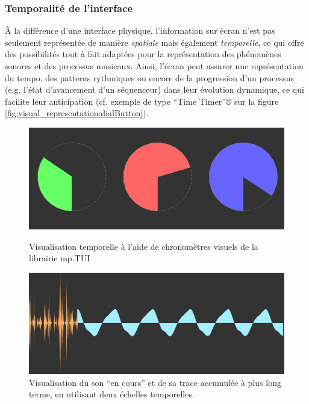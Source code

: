 \subsubsection{Temporalité de l'interface} 

\noindent À la différence d'une interface physique, l'information sur écran n'est pas seulement représentée de manière \textit{spatiale} mais également \textit{temporelle}, ce qui offre des possibilités tout à fait adaptées pour la représentation des phénomènes sonores et des processus musicaux. Ainsi, l'écran peut assurer une représentation du tempo, des patterns rythmiques ou encore de la progression d'un processus (e.g. l'état d'avancement d'un séquenceur) dans leur évolution dynamique, ce qui facilite leur anticipation (cf. exemple de type ``Time Timer''® sur la figure \ref{fig:visual_representation:dialButton}).\\
\begin{figure}[!htbp]
	\captionsetup{format=plain}%
	\centering
	\begin{minipage}[t]{0.48\textwidth}
		\includegraphics[width=\linewidth]{gfx/06_visual_representation/mpTUI-DialButton.png}
		\caption[Visualisation temporelle à l'aide de chronomètres visuels]{Visualisation temporelle à l'aide de chronomètres visuels de la librairie mp.TUI}
		\label{fig:visual_representation:dialButton}
	\end{minipage}
	\hspace{.02\linewidth}
	\begin{minipage}[t]{0.48\textwidth}
	    \includegraphics[width=\linewidth]{gfx/06_visual_representation/LAM-DSW.png}
		\caption[Deux échelles temporelles différentes d'un flux audio]{Visualisation du son ``en cours'' et de sa trace accumulée à plus long terme, en utilisant deux échelles temporelles.}
		\label{fig:visual_representation:DSW}
	\end{minipage}
\end{figure}
